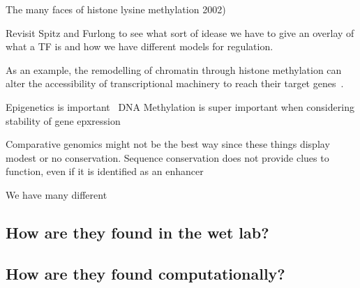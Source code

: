         The many faces of histone lysine methylation 2002)
        
        Revisit Spitz and Furlong to see what sort of idease we have to give an overlay of what a TF is and how we have different models for regulation. 
        
       
        
        
        
        As an example, the remodelling of chromatin through histone methylation can alter the accessibility of transcriptional machinery to reach their target genes~\cite{gibney2010epigenetics, holoch2015rna}. 
        
        Epigenetics is important~\cite{holliday2006epigenetics}
        DNA Methylation is super important when considering stability of gene epxression~\cite{jaenisch2003epigenetic}
        
        Comparative genomics might not be the best way since these things display modest or no conservation. Sequence conservation does not provide clues to function, even if it is identified as an enhancer~\cite{pennacchio2013enhancers}
        
        
        We have many different 
        \subsection{How are they found in the wet lab?}
            
        \subsection{How are they found computationally?}
        
        
            
            
